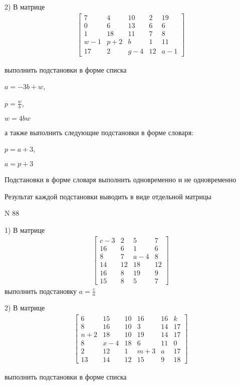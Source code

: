 \documentclass[11pt]{report}
\begin{document}
    2) В матрице
\begin{align*}
\left[\begin{matrix}7 & 4 & 10 & 2 & 19\\0 & 6 & 13 & 6 & 6\\1 & 18 & 11 & 7 & 8\\w - 1 & p + 2 & b & 1 & 11\\17 & 2 & g - 4 & 12 & a - 1\end{matrix}\right]
\end{align*}

выполнить подстановки в форме списка

$a=- 3 b + w$,

$p=\frac{w}{b}$,

$w=4 b w$

а также выполнить следующие подстановки в форме словаря:

$p=a + 3$,

$a=p + 3$


    Подстановки в форме словаря выполнить одновременно и не одновременно


    Результат каждой подстановки выводить в виде отдельной матрицы

\newpage
N 88


    1) В матрице
\begin{align*}
\left[\begin{matrix}c - 3 & 2 & 5 & 7\\16 & 6 & 1 & 6\\8 & 7 & a - 4 & 8\\14 & 12 & 18 & 12\\16 & 8 & 19 & 9\\15 & 8 & 5 & 7\end{matrix}\right]
\end{align*}
выполнить подстановку $a=\frac{c}{a}$


    2) В матрице
\begin{align*}
\left[\begin{matrix}6 & 15 & 10 & 16 & 16 & k\\8 & 16 & 10 & 3 & 14 & 17\\n + 2 & 18 & 10 & 19 & 14 & 17\\8 & x - 4 & 18 & 6 & 11 & 0\\2 & 12 & 1 & m + 3 & a & 17\\13 & 14 & 12 & 15 & 9 & 18\end{matrix}\right]
\end{align*}

выполнить подстановки в форме списка
\end{document}
